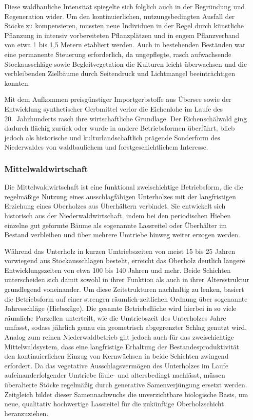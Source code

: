 \documentclass[twocolumn, bibliography=totoc, abstract=true]{scrartcl}
\begin{document}
Diese waldbauliche Intensität spiegelte sich folglich auch in der Begründung und Regeneration wider. Um den kontinuierlichen, nutzungsbedingten Ausfall der Stöcke zu kompensieren, mussten neue Individuen in der Regel durch künstliche Pflanzung in intensiv vorbereiteten Pflanzplätzen und in engem Pflanzverband von etwa 1 bis 1,5 Metern etabliert werden. Auch in bestehenden Beständen war eine permanente Steuerung erforderlich, da ungepflegte, rasch aufwachsende Stockausschläge sowie Begleitvegetation die Kulturen leicht überwachsen und die verbleibenden Zielbäume durch Seitendruck und Lichtmangel beeinträchtigen konnten.

Mit dem Aufkommen preisgünstiger Importgerbstoffe aus Übersee sowie der Entwicklung synthetischer Gerbmittel verlor die Eichenlohe im Laufe des 20.~Jahrhunderts rasch ihre wirtschaftliche Grundlage. Der Eichenschälwald ging dadurch flächig zurück oder wurde in andere Betriebsformen überführt, blieb jedoch als historische und kulturlandschaftlich prägende Sonderform des Niederwaldes von waldbaulichem und forstgeschichtlichem Interesse.

\subsubsection{Mittelwaldwirtschaft}

Die Mittelwaldwirtschaft ist eine funktional zweischichtige Betriebsform, die die regelmäßige Nutzung eines ausschlagfähigen Unterholzes mit der langfristigen Erziehung eines Oberholzes aus Überhältern verbindet. Sie entwickelt sich historisch aus der Niederwaldwirtschaft, indem bei den periodischen Hieben einzelne gut geformte Bäume als sogenannte Lassreitel oder Überhälter im Bestand verbleiben und über mehrere Umtriebe hinweg weiter erzogen werden.

Während das Unterholz in kurzen Umtriebszeiten von meist 15 bis 25 Jahren vorwiegend aus Stockausschlägen besteht, erreicht das Oberholz deutlich längere Entwicklungszeiten von etwa 100 bis 140 Jahren und mehr. Beide Schichten unterscheiden sich damit sowohl in ihrer Funktion als auch in ihrer Altersstruktur grundlegend voneinander. Um diese Zeitstrukturen nachhaltig zu lenken, basiert die Betriebsform auf einer strengen räumlich-zeitlichen Ordnung über sogenannte Jahresschläge (Hiebszüge). Die gesamte Betriebsfläche wird hierbei in so viele räumliche Parzellen unterteilt, wie die Umtriebszeit des Unterholzes Jahre umfasst, sodass jährlich genau ein geometrisch abgegrenzter Schlag genutzt wird. Analog zum reinen Niederwaldbetrieb gilt jedoch auch für das zweischichtige Mittelwaldsystem, dass eine langfristige Erhaltung der Bestandesproduktivität den kontinuierlichen Einzug von Kernwüchsen in beide Schichten zwingend erfordert. Da das vegetative Ausschlagsvermögen des Unterholzes im Laufe aufeinanderfolgender Umtriebe fäule- und altersbedingt nachlässt, müssen überalterte Stöcke regelmäßig durch generative Samenverjüngung ersetzt werden. Zeitgleich bildet dieser Samennachwuchs die unverzichtbare biologische Basis, um neue, qualitativ hochwertige Lassreitel für die zukünftige Oberholzschicht heranzuziehen.
\end{document}
